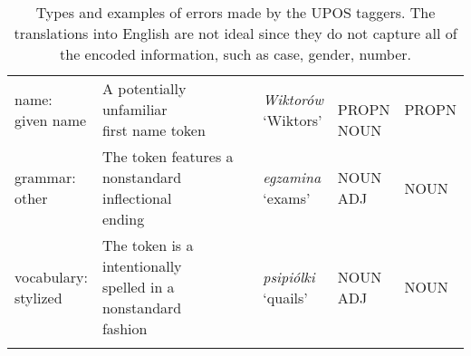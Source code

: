 \begin{longtable}[H]{p{2cm}p{4.5cm}p{3.5cm}p{1.75cm}p{1.75cm}}
\makecell[l]{name: \\ given name} & \makecell[l]{A potentially unfamiliar \\ first name token} & \makecell[l]{\textit{Wiktorów} \\ `Wiktors'} & \makecell[l]{\\ PROPN \\ NOUN} & PROPN \\

\makecell[l]{grammar: \\ other} & \makecell[l]{The token features a \\ nonstandard inflectional \\ ending} & \makecell[l]{\textit{egzamina} \\ `exams'} & \makecell[l]{NOUN \\ ADJ} & NOUN \\

\makecell[l]{vocabulary: \\ stylized} & \makecell[l]{The token is a intentionally \\ spelled in a nonstandard \\ fashion} & \makecell[l]{\textit{psipiólki} \\ `quails'} & \makecell[l]{NOUN \\ ADJ} & NOUN \\ 

\bottomrule
\caption{\label{table:error-type-upos-explanations} Types and examples of errors made by the UPOS taggers. The translations into English are not ideal since they do not capture all of the encoded information, such as case, gender, number.}
\end{longtable}
\newpage

